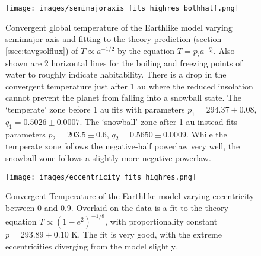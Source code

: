 \documentclass[12pt, onecolumn]{revtex4-2}    %
\begin{document}
\begin{figure}
    \texttt{[image: images/semimajoraxis\_fits\_highres\_bothhalf.png]}
    \caption{Convergent global temperature of the Earthlike model varying semimajor axis and fitting to the theory prediction (section \ref{ssec:tavgsolflux}) of $T \propto a^{-1/2}$ by the equation $T = p_i a^{-q_i}$.
        Also shown are 2 horizontal lines for the boiling and freezing points of water to roughly indicate habitability.
        There is a drop in the convergent temperature just after 1 au where the reduced insolation cannot prevent the planet from falling into a snowball state.
        The `temperate' zone before 1 au fits with parameters $p_1 = 294.37 \pm 0.08$, $q_1 = 0.5026 \pm 0.0007$.
        The `snowball' zone after 1 au instead fits parameters $p_2 = 203.5 \pm 0.6$, $q_2 = 0.5650 \pm 0.0009$.
        While the temperate zone follows the negative-half powerlaw very well, the snowball zone follows a slightly more negative powerlaw.}
    \label{fig:temperature_semimajoraxis}
\end{figure}

\begin{figure}
    \texttt{[image: images/eccentricity\_fits\_highres.png]}
    \caption{
        Convergent Temperature of the Earthlike model varying eccentricity between 0 and 0.9.
        Overlaid on the data is a fit to the theory equation $T\propto(1-e^2)^{-1/8}$, with proportionality constant $p=293.89 \pm 0.10$ K.
        The fit is very good, with the extreme eccentricities diverging from the model slightly.
    }
    \label{fig:temperature_eccentricity}
\end{figure}
\end{document}
